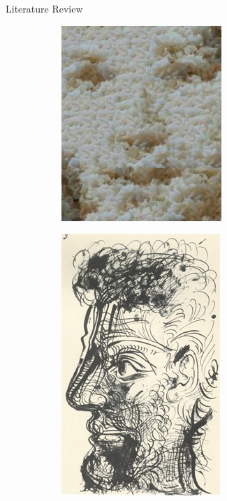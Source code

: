 \documentclass{beamer}
\begin{document}
\begin{frame}{Literature Review}
\begin{figure}[H]
\begin{subfigure}[b]{.3\textwidth}
            \includegraphics[width=.8\textwidth]{img/previous_works_transfer.png}
        \end{subfigure}
        \begin{subfigure}[b]{.3\textwidth}
            \includegraphics[width=.8\textwidth]{img/previous_worksII_style.png}

\end{subfigure}
\end{figure}
\end{frame}
\end{document}
